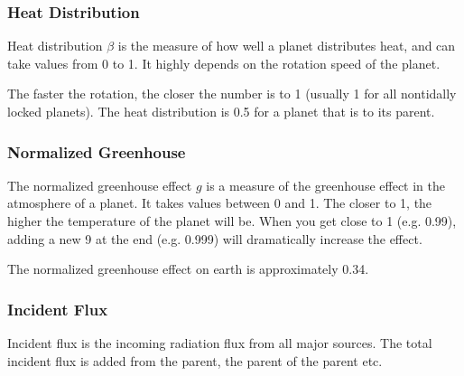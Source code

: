 \documentclass[letterpaper,10pt,english]{sphinxmanual}
\begin{document}
\subsubsection{Heat Distribution}
\label{\detokenize{quantities/surface/emission/heat_distribution:heat-distribution}}\label{\detokenize{quantities/surface/emission/heat_distribution::doc}}\label{\detokenize{quantities/surface/emission/heat_distribution:id1}}
\sphinxAtStartPar
Heat distribution \(\beta\) is the measure of how well a planet distributes heat,
and can take values from 0 to 1. It highly depends on the rotation speed of the planet.

\sphinxAtStartPar
The faster the rotation, the closer the number is to 1 (usually 1 for all non\sphinxhyphen{}tidally locked planets).
The heat distribution is 0.5 for a planet that is {\hyperref[\detokenize{quantities/children_orbit_limits/tidal_locking_radius:id1}]{}} to its parent.


\subsubsection{Normalized Greenhouse}
\label{\detokenize{quantities/surface/emission/normalized_greenhouse:normalized-greenhouse}}\label{\detokenize{quantities/surface/emission/normalized_greenhouse::doc}}\label{\detokenize{quantities/surface/emission/normalized_greenhouse:id1}}
\sphinxAtStartPar
The normalized greenhouse effect \(g\) is a measure of the greenhouse effect in the atmosphere of a planet.
It takes values between 0 and 1. The closer to 1, the higher the temperature of the planet will be.
When you get close to 1 (e.g. 0.99), adding a new 9 at the end (e.g. 0.999) will dramatically increase the effect.

\sphinxAtStartPar
The normalized greenhouse effect on earth is approximately 0.34.


\subsubsection{Incident Flux}
\label{\detokenize{quantities/surface/emission/incident_flux:incident-flux}}\label{\detokenize{quantities/surface/emission/incident_flux::doc}}\label{\detokenize{quantities/surface/emission/incident_flux:id1}}
\sphinxAtStartPar
Incident flux is the incoming radiation flux from all major sources.
The total incident flux is added from the parent, the parent of the parent
etc.
\end{document}
